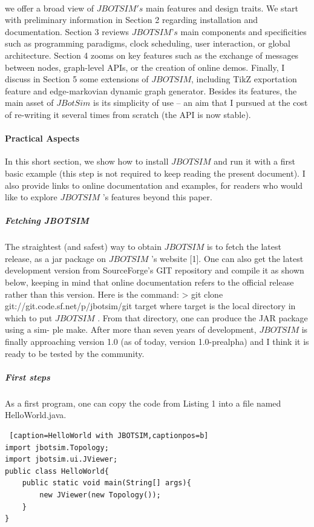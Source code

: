\paragraph{}we offer a broad view of $JBOTSIM's$ main features and design traits. We start with preliminary information in Section 2 regarding installation and documentation. Section 3 reviews $JBOTSIM’s$ main components and specificities such as programming paradigms, clock scheduling, user interaction, or global architecture. Section 4 zooms on key features such as the exchange of messages between nodes, graph-level APIs, or the creation of online demos. Finally, I discuss in Section 5 some extensions of $JBOTSIM$, including TikZ exportation feature and edge-markovian dynamic graph generator. Besides its features, the main asset of $JBotSim$ is its simplicity of use – an aim that I pursued at the cost of re-writing it several times from scratch (the API is now stable).
\paragraph{Practical Aspects}In this short section, we show how to install $JBOTSIM$ and run it with a first basic example (this step is not required to keep reading the present document). I also provide links to online documentation and examples, for readers who would like to explore  $JBOTSIM$ ’s features beyond this paper.
\subparagraph{Fetching JBOTSIM}The straightest (and safest) way to obtain $JBOTSIM$ is to fetch the latest release, as a jar package on  $JBOTSIM$ ’s website [1]. One can also get the latest development version from SourceForge’s GIT repository and compile it as shown below, keeping in mind that online documentation refers to the official release rather than this version. Here is the command: > git clone git://git.code.sf.net/p/jbotsim/git target where target is the local directory in which to put  $JBOTSIM$ . From that directory, one can produce the JAR package using a sim- ple make. After more than seven years of development, $JBOTSIM$ is finally approaching version 1.0 (as of today, version 1.0-prealpha) and I think it is ready to be tested by the community.
\subparagraph{First steps}As a first program, one can copy the code from Listing 1 into a file named HelloWorld.java.


\begin{lstlisting} [caption=HelloWorld with JBOTSIM,captionpos=b]
import jbotsim.Topology;
import jbotsim.ui.JViewer;
public class HelloWorld{
	public static void main(String[] args){
		new JViewer(new Topology());
	} 
}
\end{lstlisting}

